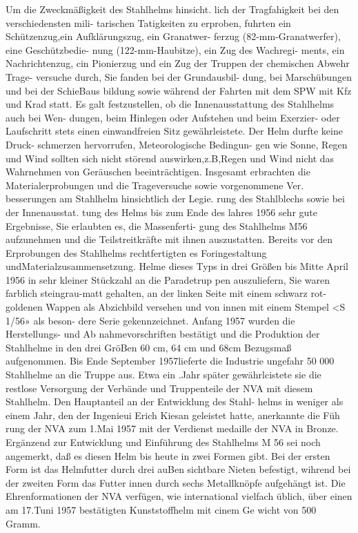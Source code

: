Um die Zweckmäßigkeit des Stahlhelms hinsicht.
lich der Tragfahigkeit bei den verschiedensten mili-
tarischen Tatigkeiten zu erproben, fuhrten ein
Schützenzug,ein Aufklärungszug, ein Granatwer-
ferzug (82-mm-Granatwerfer), eine Geschützbedie-
nung (122-mm-Haubitze), ein Zug des Wachregi-
ments, ein Nachrichtenzug, cin Pionierzug und ein
Zug der Truppen der chemischen Abwehr Trage-
versuche durch, Sie fanden bei der Grundausbil-
dung, bei Marschübungen und bei der SchieBaus
bildung sowie während der Fahrten mit dem SPW
mit Kfz und Krad statt. Es galt festzustellen, ob die
Innenausstattung des Stahlhelms auch bei Wen-
dungen, beim Hinlegen oder Aufstehen und beim
Exerzier- oder Laufschritt stets einen einwandfreien
Sitz gewährleistete. Der Helm durfte keine Druck-
schmerzen hervorrufen, Meteorologische Bedingun-
gen wie Sonne, Regen und Wind sollten sich nicht störend auswirken,z.B,Regen und Wind nicht das
Wahrnehmen von Geräuschen beeinträchtigen.
Insgesamt erbrachten die Materialerprobungen
und die Trageversuche sowie vorgenommene Ver.
besserungen am Stahlhelm hinsichtlich der Legie.
rung des Stahlblechs sowie bei der Innenausstat.
tung des Helms bis zum Ende des lahres 1956 sehr
gute Ergebnisse, Sie erlaubten es, die Massenferti-
gung des Stahlhelms M56 aufzunehmen und die
Teilstreitkräfte mit ihnen auszustatten. Bereits vor
den Erprobungen des Stahlhelms rechtfertigten es
Foringestaltung undMaterialzusammensetzung.
Helme dieses Typs in drei Größen bis Mitte April
1956 in sehr kleiner Stückzahl an die Paradetrup
pen auszuliefern, Sie waren farblich steingrau-matt
gehalten, an der linken Seite mit einem schwarz
rot-goldenen Wappen als Abzichbild versehen und
von innen mit einem Stempel <S 1/56» als beson-
dere Serie gekennzeichnet.
Anfang 1957 wurden die Herstellungs- und Ab
nahmevorschriften bestätigt und die Produktion
der Stahlhelme in den drei GröBen 60 cm, 64 cm
und 68cm Bezugsmaß aufgenommen. Bis Ende
September 1957lieferte die Industrie ungefahr
50 000 Stahlhelme an die Truppe aus. Etwa ein .Jahr
später gewährlcistete sie die restlose Versorgung der
Verbände und Truppenteile der NVA mit diesem
Stahlhelm.
Den Hauptanteil an der Entwicklung des Stahl-
helms in weniger als einem Jahr, den der Ingenieui
Erich Kiesan geleistet hatte, anerkannte die Füh
rung der NVA zum 1.Mai 1957 mit der Verdienst
medaille der NVA in Bronze.
Ergänzend zur Entwicklung und Einführung des
Stahlhelms M 56 sei noch angemerkt, daß es diesen
Helm bis heute in zwei Formen gibt. Bei der ersten
Form ist das Helmfutter durch drei auBen sichtbare
Nieten befestigt, wihrend bei der zweiten Form das
Futter innen durch sechs Metallknöpfe aufgehängt
ist. Die Ehrenformationen der NVA verfügen, wie
international vielfach üblich, über einen am 17.Tuni
1957 bestätigten Kunststoffhelm mit cinem Ge
wicht von 500 Gramm.